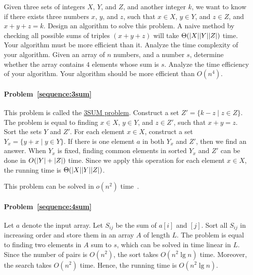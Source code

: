\begin{Exercise}
\Question Given three sets of integers $X$, $Y$, and $Z$, and another integer $k$, we want to know if there exists three numbers $x$, $y$, and $z$, such that $x \in X$, $y \in Y$, and $z \in Z$, and $x + y + z = k$. Design an algorithm to solve this problem. A naive method by checking all possible sums of triples $(x+y+z)$ will take $\Theta(\lvert X\rvert\lvert Y\rvert\lvert Z\rvert)$ time. Your algorithm must be more efficient than it. Analyze the time complexity of your algorithm. \label{sequence:3sum} 
\Question Given an array of $n$ numbers, and a number $s$, determine whether the array contains $4$ elements whose sum is $s$. Analyze the time efficiency of your algorithm. Your algorithm should be more efficient than $O(n^4)$.  \label{sequence:4sum}  
\end{Exercise}
\begin{Answer}
\paragraph{Problem~\ref{sequence:3sum}} 
This problem is called the \href{https://en.wikipedia.org/wiki/3SUM}{3SUM problem}. Construct a set $Z' = \{k - z \mid z \in Z\}$. The problem is equal to finding $x \in X$, $y \in Y$, and $z \in Z'$, such that $x + y = z$. Sort the sets $Y$ and $Z'$. For each element $x \in X$, construct a set $Y_x = \{y + x \mid y \in Y\}$. If there is one element $a$ in both  $Y_x$ and $Z'$, then we find an answer. When $Y_x$ is fixed, finding common elements in sorted $Y_x$ and $Z'$ can be done in $O(\lvert Y\rvert+\lvert Z\rvert)$ time. Since we apply this operation for each element $x \in X$, the running time is $\Theta(\lvert X\rvert\lvert Y\rvert\lvert Z\rvert)$.

\begin{remark}
This problem can be solved in $o(n^2)$ time~\cite{Jorgensen2014}.
\end{remark}

\paragraph{Problem~\ref{sequence:4sum}} Let $a$ denote the input array. Let $S_{ij}$ be the sum of $a[i]$ and $[j]$. Sort all $S_{ij}$ in increasing order and store them in an array $A$ of length $L$. The problem is equal to finding two elements in $A$ sum to $s$, which can be solved in time linear in $L$. Since the number of pairs is $O(n^2)$, the sort takes $O(n^2 \lg n)$ time. Moreover, the search takes $O(n^2)$ time. Hence, the running time is $O(n^2 \lg n)$.
\end{Answer}

